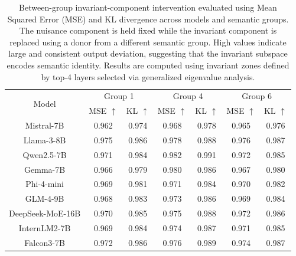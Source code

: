 \begin{table}[h]
\centering
\small
\setlength{\tabcolsep}{5pt}
\renewcommand{\arraystretch}{1.2}
\begin{tabular}{c|cc|cc|cc}
\hline
\multirow{2}{*}{Model} 
& \multicolumn{2}{c|}{Group 1}
& \multicolumn{2}{c|}{Group 4}
& \multicolumn{2}{c}{Group 6} \\

& MSE $\uparrow$ & KL $\uparrow$
& MSE $\uparrow$ & KL $\uparrow$
& MSE $\uparrow$ & KL $\uparrow$ \\
\hline

Mistral-7B 
& 0.962 & 0.974 
& 0.968 & 0.978 
& 0.965 & 0.976 \\

Llama-3-8B 
& 0.975 & 0.986 
& 0.978 & 0.988 
& 0.976 & 0.987 \\

Qwen2.5-7B
& 0.971 & 0.984
& 0.982 & 0.991
& 0.972 & 0.985 \\

Gemma-7B
& 0.966 & 0.979
& 0.980 & 0.986
& 0.967 & 0.980 \\

Phi-4-mini
& 0.969 & 0.981
& 0.971 & 0.984
& 0.970 & 0.982 \\

GLM-4-9B
& 0.968 & 0.983
& 0.973 & 0.986
& 0.969 & 0.984 \\

DeepSeek-MoE-16B
& 0.970 & 0.985
& 0.975 & 0.988
& 0.972 & 0.986 \\

InternLM2-7B
& 0.969 & 0.984
& 0.974 & 0.987
& 0.971 & 0.985 \\

Falcon3-7B
& 0.972 & 0.986
& 0.976 & 0.989
& 0.974 & 0.987 \\

\hline
\end{tabular}
\vspace{0.5em}
\caption{Between-group invariant-component intervention evaluated using Mean Squared Error (MSE) and KL divergence across models and semantic groups. The nuisance component is held fixed while the invariant component is replaced using a donor from a different semantic group. High values indicate large and consistent output deviation, suggesting that the invariant subspace encodes semantic identity. Results are computed using invariant zones defined by top-4 layers selected via generalized eigenvalue analysis.}
\label{tab:between_group_inv}
\vspace{-2.0em}
\end{table}

